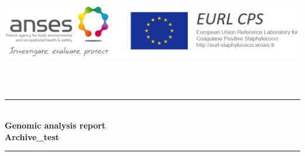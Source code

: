 \documentclass[a4paper]{article}
\begin{document}
\begin{titlepage}

\newcommand{\HRule}{\rule{\linewidth}{0.5mm}} %
\setlength{\topmargin}{0in}

\begin{minipage}{0.4\textwidth}
\begin{flushleft} \large
\hspace*{-0.5cm}
\includegraphics[scale=0.65]{latex_images/Anses-EURL.png}\\ 
\end{flushleft}
\end{minipage}\\[2cm]
~
\center %



\HRule \\[0.4cm]
{ \huge \bfseries Genomic analysis report}\\[0.4cm] %
{ \huge \bfseries Archive\_test}\\[0.4cm] %
\HRule \\[1cm]
 

\end{titlepage}
\end{document}
